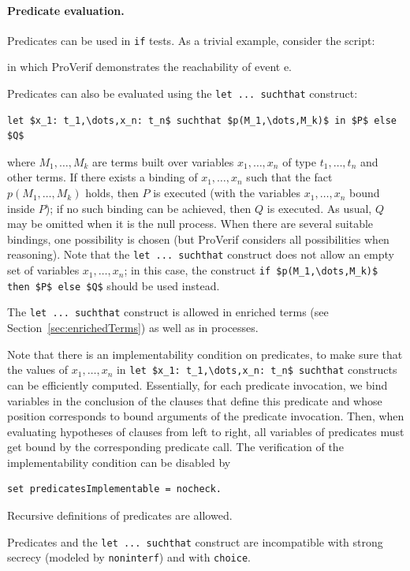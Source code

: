 \documentclass{book}
\begin{document}
\paragraph{Predicate evaluation.}
Predicates can be used in \lstinline!if! tests.
As a trivial example, consider the script:
%

%
in which ProVerif demonstrates the reachability of event e.

Predicates can also be evaluated  using the \lstinline!let ... suchthat! construct:
\begin{lstlisting}[numbers=none]
	let $x_1: t_1,\dots,x_n: t_n$ suchthat $p(M_1,\dots,M_k)$ in $P$ else $Q$
\end{lstlisting}
where $M_1,\ldots,M_k$ are terms built over variables $x_1,\ldots,x_n$ of type $t_1,\ldots,t_n$ and other terms. If there exists a binding of $x_1, \ldots, x_n$ such that the fact $p(M_1, \dots, M_k)$ holds, then $P$ is executed (with the variables $x_1,\ldots,x_n$ bound inside $P$); if no such binding can be achieved, then $Q$ is executed. As usual, $Q$ may be omitted when it is the null process.
%
When there are several suitable bindings, one possibility is chosen (but ProVerif considers all possibilities when reasoning). Note that the \lstinline!let ... suchthat! construct does not allow an empty set of variables $x_1,\ldots,x_n$; in this case, the construct \lstinline!if $p(M_1,\dots,M_k)$ then $P$ else $Q$! should be used instead.

The \lstinline!let ... suchthat! construct is allowed in enriched
terms (see Section~\ref{sec:enrichedTerms}) as well as in processes.

Note that there is an implementability condition on predicates, to make sure that the values of $x_1, \ldots, x_n$ in \lstinline!let $x_1: t_1,\dots,x_n: t_n$ suchthat! constructs can be efficiently computed. Essentially, for each predicate invocation, we bind variables in the conclusion of the clauses that define this predicate and whose position corresponds to bound arguments of the predicate invocation. Then, when evaluating hypotheses of clauses from left to right, all variables of predicates must get bound by the corresponding predicate call.
The verification of the implementability condition can be disabled by
\begin{lstlisting}[numbers=none]
  set predicatesImplementable = nocheck.
\end{lstlisting}
Recursive definitions of predicates are allowed.

Predicates and the \lstinline!let ... suchthat! construct are incompatible with strong secrecy (modeled by \lstinline!noninterf!) and with \lstinline!choice!.
\end{document}
